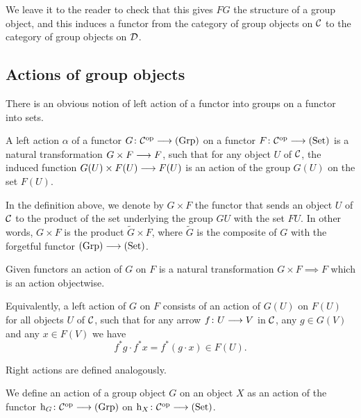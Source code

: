 \begin{2   CONTRAVARIANT FUNCTORS}
\begin{2.2 Group objects}
\begin{remark}
We leave it to the reader to check that this gives $FG$ the structure of a group object, and this induces a functor from the category of group objects on $\mathcal{C}$ to the category of group objects on $\mathcal{D}$.
\end{remark}






\subsection{Actions of group objects}\label{subsec:actions}


There is an obvious notion of left action of a functor into groups on a functor into sets.

\begin{definition}%
A left action $\alpha$ of a functor $G \colon \cC\op \arr \catgrp$ on a functor $F \colon \cC\op \arr \catset$ is a natural transformation $G \times F \arr F$, such that for any object $U$ of $\mathcal{C}$, the induced function $G(U) \times F(U) \arr F(U)$ is an action of the group $G(U)$ on the set $F(U)$.
\end{definition}

In the definition above, we denote by $G \times F$ the functor that sends an object $U$ of $\mathcal{C}$ to the product of the set underlying the group $GU$ with the set $FU$. In other words, $G \times F$ is the product $\widetilde{G} \times F$, where $\widetilde{G}$ is the composite of $G$ with the forgetful functor $\catgrp \arr \catset$.
\begin{shaded}
Given functors 
an action of $G$ on $F$ is a natural transformation $G\times F\implies F$ which is an action objectwise.
\end{shaded}

Equivalently, a left action of $G$ on $F$ consists of an action of $G(U)$ on $F(U)$ for all objects $U$ of $\mathcal{C}$, such that for any arrow $f \colon U \arr V$ in $\mathcal{C}$, any $g \in G(V)$ and any $x \in F(V)$ we have
   \[
   f^*g \cdot f^*x = f^*(g \cdot x) \in F(U).
   \]

Right actions are defined analogously.

We define an action of a group object $G$ on an object $X$ as an action of the functor $\h_G \colon \cC\op \arr \catgrp$ on $\h_X \colon \cC\op \arr \catset$.


\end{2.2 Group objects}
\end{2   CONTRAVARIANT FUNCTORS}
